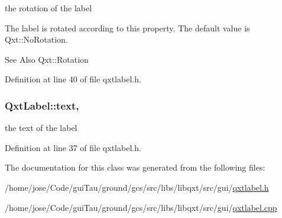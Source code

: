 the rotation of the label 

The label is rotated according to this property. The default value is Qxt\-::\-No\-Rotation.

\begin{DoxySeeAlso}{See Also}
Qxt\-::\-Rotation 
\end{DoxySeeAlso}


Definition at line 40 of file qxtlabel.\-h.

\hypertarget{class_qxt_label_a62d0ce110fe3e51ea6ea82cd8e60d430}{
\subsubsection[{text}]{ Qxt\-Label\-::text\hspace{0.3cm}{\ttfamily [read]}, {\ttfamily [write]}}}\label{class_qxt_label_a62d0ce110fe3e51ea6ea82cd8e60d430}


the text of the label 



Definition at line 37 of file qxtlabel.\-h.



The documentation for this class was generated from the following files\-:\begin{DoxyCompactItemize}
\item 
/home/jose/\-Code/gui\-Tau/ground/gcs/src/libs/libqxt/src/gui/\hyperlink{qxtlabel_8h}{qxtlabel.\-h}\item 
/home/jose/\-Code/gui\-Tau/ground/gcs/src/libs/libqxt/src/gui/\hyperlink{qxtlabel_8cpp}{qxtlabel.\-cpp}\end{DoxyCompactItemize}

